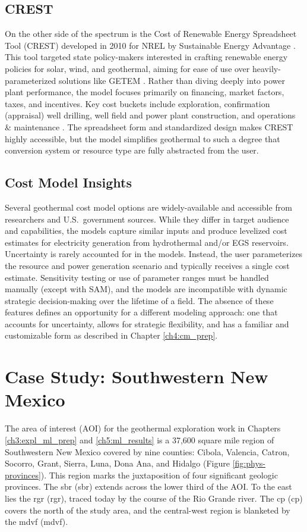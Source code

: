 \subsection{CREST}\label{ch2:crest}
On the other side of the spectrum is the Cost of Renewable Energy Spreadsheet Tool (CREST) developed in 2010 for NREL by Sustainable Energy Advantage \citep{gifford_crest_2013}. This tool targeted state policy-makers interested in crafting renewable energy policies for solar, wind, and geothermal, aiming for ease of use over heavily-parameterized solutions like GETEM \citep{gifford_renewable_2011}. Rather than diving deeply into power plant performance, the model focuses primarily on financing, market factors, taxes, and incentives. Key cost buckets include exploration, confirmation (appraisal) well drilling, well field and power plant construction, and operations \& maintenance \citep{gifford_crest_2013}. The spreadsheet form and standardized design makes CREST highly accessible, but the model simplifies geothermal to such a degree that conversion system or resource type are fully abstracted from the user. 

\subsection{Cost Model Insights}\label{ch2:cost_model_insights}
Several geothermal cost model options are widely-available and accessible from researchers and U.S.\ government sources. While they differ in target audience and capabilities, the models capture similar inputs and produce levelized cost estimates for electricity generation from hydrothermal and/or EGS reservoirs. Uncertainty is rarely accounted for in the models. Instead, the user parameterizes the resource and power generation scenario and typically receives a single cost estimate. Sensitivity testing or use of parameter ranges must be handled manually (except with SAM), and the models are incompatible with dynamic strategic decision-making over the lifetime of a field. The absence of these features defines an opportunity for a different modeling approach: one that accounts for uncertainty, allows for strategic flexibility, and has a familiar and customizable form as described in Chapter \ref{ch4:cm_prep}. 

\section{Case Study: Southwestern New Mexico}\label{ch2:case_outline}
The area of interest (AOI) for the geothermal exploration work in Chapters \ref{ch3:expl_ml_prep} and \ref{ch5:ml_results} is a 37,600 square mile region of Southwestern New Mexico covered by nine counties: Cibola, Valencia, Catron, Socorro, Grant, Sierra, Luna, Dona Ana, and Hidalgo (Figure \ref{fig:phys-provinces}). This region marks the juxtaposition of four significant geologic provinces. The \acrlong{sbr} (\acrshort{sbr}) extends across the lower third of the AOI. To the east lies the \acrlong{rgr} (\acrshort{rgr}), traced today by the course of the Rio Grande river. The \acrlong{cp} (\acrshort{cp}) covers the north of the study area, and the central-west region is blanketed by the \acrlong{mdvf} (\acrshort{mdvf}).


